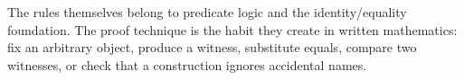 \begin{remark}
The rules themselves belong to predicate logic and the identity/equality
foundation. The proof technique is the habit they create in written
mathematics: fix an arbitrary object, produce a witness, substitute equals,
compare two witnesses, or check that a construction ignores accidental names.
\end{remark}

